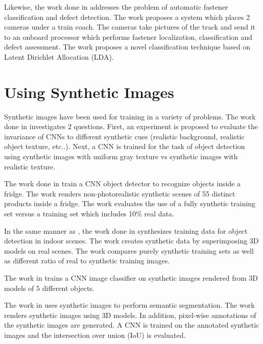 Likewise, the work done in \cite{feng2014automatic} addresses the problem of automatic fastener classification and defect detection. The work proposes a system which places 2 cameras under a train coach. The cameras take pictures of the track and send it to an onboard processor which performs fastener localization, classification and defect assessment. The work proposes a novel classification technique based on Latent Dirichlet Allocation (LDA).


\section{Using Synthetic Images}
Synthetic images have been used for training in a variety of problems. The work done in \cite{peng2015learning} investigates 2 questions. First, an experiment is proposed to evaluate the invariance of CNNs to different synthetic cues (realistic background, realistic object texture, etc..). Next, a CNN is trained for the task of object detection using synthetic images with uniform gray texture vs synthetic images with realistic texture.

The work done in \cite{rajpura2017object} train a CNN object detector to recognize objects inside a fridge. The work renders non-photorealistic synthetic scenes of 55 distinct products inside a fridge. The work evaluates the use of a fully synthetic training set versus a training set which includes 10\% real data.

In the same manner as \cite{rajpura2017object}, the work done in \cite{georgakis2017synthesizing} synthesizes training data for object detection in indoor scenes. The work creates synthetic data by superimposing 3D models on real scenes. The work compares purely synthetic training sets as well as different ratio of real to synthetic training images.

The work in \cite{sarkar2017trained} trains a CNN image classifier on synthetic images rendered from 3D models of 5 different objects.

The work in \cite{goyal2017dataset} uses synthetic images to perform semantic segmentation. The work renders synthetic images using 3D models. In addition, pixel-wise annotations of the synthetic images are generated. A CNN is trained on the annotated synthetic images and the intersection over union (IoU) is evaluated.